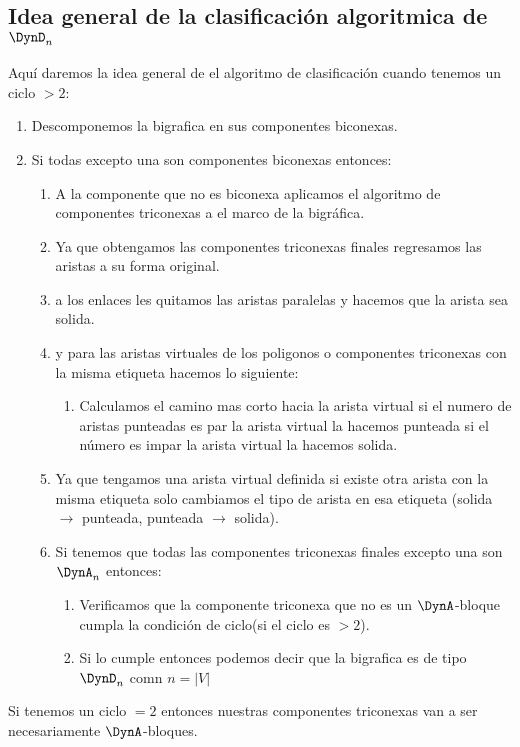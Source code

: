 \subsection{Idea general de la clasificación algoritmica de $\DynD_{n}$}
Aquí daremos la idea general de el algoritmo de clasificación cuando tenemos un ciclo $>2$:
\begin{enumerate}
 \item Descomponemos la bigrafica en sus componentes biconexas.
 \item Si todas excepto una son componentes biconexas entonces:
 \begin{enumerate}
  \item A la componente que no es biconexa aplicamos el algoritmo de componentes triconexas a el marco de la bigráfica.
 \item Ya que obtengamos las componentes triconexas finales regresamos las aristas a su forma original.
 \item a los enlaces les quitamos las aristas paralelas y hacemos que la arista sea solida.
 \item y para las aristas virtuales de los poligonos o componentes triconexas con la misma etiqueta hacemos lo siguiente:
 \begin{enumerate}
  \item Calculamos el camino mas corto hacia la arista virtual si el numero de aristas punteadas es par la arista virtual la hacemos punteada si el número es impar la arista virtual la hacemos solida.
 \end{enumerate}
 \item Ya que tengamos una arista virtual definida si existe otra arista con la misma etiqueta solo cambiamos el tipo de arista en esa etiqueta (solida $\rightarrow $ punteada, punteada $\rightarrow $ solida).
 \item Si tenemos que todas las componentes triconexas finales excepto una son $\DynA_{n}$ entonces:
 \begin{enumerate}
  \item Verificamos que la componente triconexa que no es un $\DynA$-bloque cumpla la condición de ciclo(si el ciclo es $>2$).
  \item Si lo cumple entonces podemos decir que la bigrafica es de tipo $\DynD_{n}$ comn $n = \left|V\right|$
 \end{enumerate}
 \end{enumerate}
\end{enumerate}

Si tenemos un ciclo $=2$ entonces nuestras componentes triconexas van a ser necesariamente $\DynA$-bloques.


